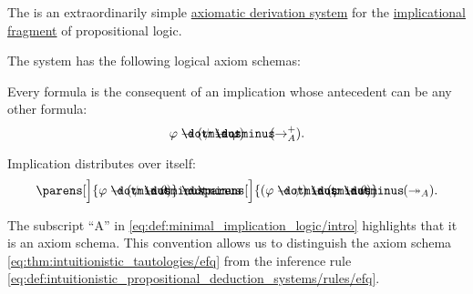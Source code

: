 \begin{definition}\label{def:minimal_implication_logic}
  The  is an extraordinarily simple \hyperref[def:axiomatic_derivation_system]{axiomatic derivation system} for the \hyperref[def:implicational_propositional_fragment]{implicational fragment} of propositional logic.

  The system has the following logical axiom schemas:
  \begin{thmenum}
     Every formula is the consequent of an implication whose antecedent can be any other formula:
    \begin{equation}\label{eq:def:minimal_implication_logic/intro}
      \varphi \synimplies (\psi \synimplies \varphi) \tag{\( \rightarrow_A^+ \)}.
    \end{equation}

     Implication distributes over itself:
    \begin{equation}\label{eq:def:minimal_implication_logic/dist}
      \parens[\Big]{ \varphi \synimplies (\psi \synimplies \theta) } \synimplies \parens[\Big]{ (\varphi \synimplies \psi) \synimplies (\varphi \synimplies \theta)} \tag{\( \twoheadrightarrow_A \)}.
    \end{equation}
  \end{thmenum}
\end{definition}
\begin{comments}
  \item The subscript \enquote{A} in \eqref{eq:def:minimal_implication_logic/intro} highlights that it is an axiom schema. This convention allows us to distinguish the axiom schema \eqref{eq:thm:intuitionistic_tautologies/efq} from the inference rule \eqref{eq:def:intuitionistic_propositional_deduction_systems/rules/efq}.
\end{comments}

